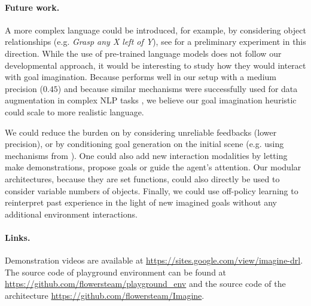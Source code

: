 \paragraph{Future work.} A more complex language could be introduced, for example, by considering object relationships (e.g. \textit{Grasp any X left of Y}), see \cite{karch2020deep} for a preliminary experiment in this direction. While the use of pre-trained language models \cite{radford2019language} does not follow our developmental approach, it would be interesting to study how they would interact with goal imagination. Because \CGH performs well in our setup with a medium precision ($0.45$) and because similar mechanisms were successfully used for data augmentation in complex NLP tasks \cite{andreas2019goodenough}, we believe our goal imagination heuristic could scale to more realistic language. 

We could reduce the burden on \SP by considering unreliable feedbacks (lower precision), or by conditioning goal generation on the initial scene (e.g. using mechanisms from \citet{ther}). One could also add new interaction modalities by letting \SP make demonstrations, propose goals or guide the agent's attention. Our modular architectures, because they are set functions, could also directly be used to consider variable numbers of objects. Finally, we could use off-policy learning \cite{fujimoto2018off} to reinterpret past experience in the light of new imagined goals without any additional environment interactions.


\paragraph{Links.} Demonstration videos are available at \url{https://sites.google.com/view/imagine-drl}. The source code of playground environment can be found at \url{https://github.com/flowersteam/playground\_env} and the source code of the \imagine architecture \url{https://github.com/flowersteam/Imagine}.




